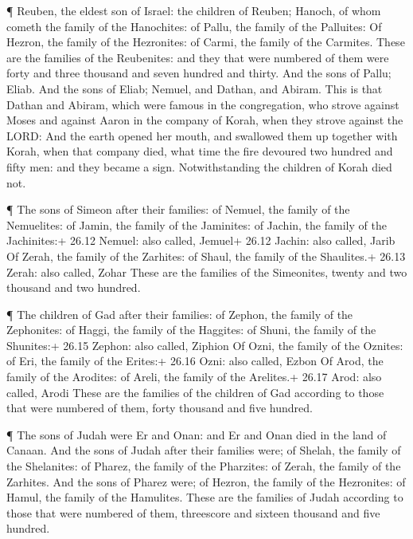  ¶ Reuben, the eldest son of Israel: the children of Reuben;
Hanoch, of whom cometh the family of the Hanochites: of Pallu, the
family of the Palluites:  Of Hezron, the family of the
Hezronites: of Carmi, the family of the Carmites.  These are
the families of the Reubenites: and they that were numbered of them were
forty and three thousand and seven hundred and thirty.  And
the sons of Pallu; Eliab.  And the sons of Eliab; Nemuel,
and Dathan, and Abiram. This is that Dathan and Abiram, which were
famous in the congregation, who strove against Moses and against Aaron
in the company of Korah, when they strove against the LORD:
 And the earth opened her mouth, and swallowed them up
together with Korah, when that company died, what time the fire devoured
two hundred and fifty men: and they became a sign. 
Notwithstanding the children of Korah died not.

 ¶ The sons of Simeon after their families: of Nemuel, the
family of the Nemuelites: of Jamin, the family of the Jaminites: of
Jachin, the family of the Jachinites:+ 26.12 Nemuel: also called,
Jemuel+ 26.12 Jachin: also called, Jarib  Of Zerah, the
family of the Zarhites: of Shaul, the family of the Shaulites.+ 26.13
Zerah: also called, Zohar  These are the families of the
Simeonites, twenty and two thousand and two hundred.

 ¶ The children of Gad after their families: of Zephon, the
family of the Zephonites: of Haggi, the family of the Haggites: of
Shuni, the family of the Shunites:+ 26.15 Zephon: also called, Ziphion
 Of Ozni, the family of the Oznites: of Eri, the family of
the Erites:+ 26.16 Ozni: also called, Ezbon  Of Arod, the
family of the Arodites: of Areli, the family of the Arelites.+ 26.17
Arod: also called, Arodi  These are the families of the
children of Gad according to those that were numbered of them, forty
thousand and five hundred.

 ¶ The sons of Judah were Er and Onan: and Er and Onan died
in the land of Canaan.  And the sons of Judah after their
families were; of Shelah, the family of the Shelanites: of Pharez, the
family of the Pharzites: of Zerah, the family of the Zarhites.
 And the sons of Pharez were; of Hezron, the family of the
Hezronites: of Hamul, the family of the Hamulites.  These
are the families of Judah according to those that were numbered of them,
threescore and sixteen thousand and five hundred.

